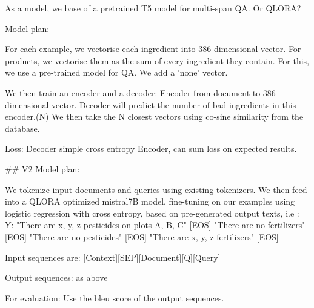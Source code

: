 As a model, we base of a pretrained T5 model for multi-span QA. 
Or QLORA? 


Model plan: 

For each example, we vectorise each ingredient into 386 dimensional vector. For products, we vectorise them as 
the sum of every ingredient they contain. 
For this, we use a pre-trained model for QA. 
We add a 'none' vector. 

We then train an encoder and a decoder: 
Encoder from document to 386 dimensional vector. 
Decoder will predict the number of bad ingredients in this encoder.(N)
We then take the N closest vectors using co-sine similarity from the database. 

Loss:
Decoder simple cross entropy
Encoder, can sum loss on expected results. 



## V2 
Model plan: 

We tokenize input documents and queries using existing tokenizers. 
We then feed into a QLORA optimized mistral7B model, fine-tuning on our examples using logistic regression with
cross entropy, based on pre-generated output texts, i.e :
Y: 
"There are x, y, z pesticides on plots A, B, C" [EOS]
"There are no fertilizers" [EOS]
"There are no pesticides" [EOS]
"There are x, y, z fertilizers" [EOS]

Input sequences are: 
[Context][SEP][Document][Q][Query]

Output sequences: 
as above

For evaluation: 
Use the bleu score of the output sequences. 